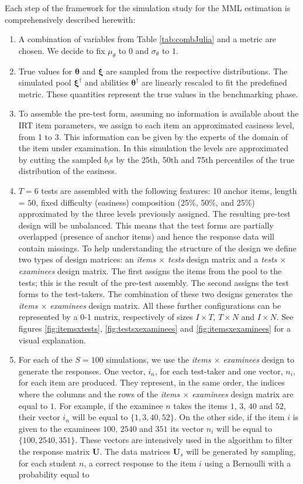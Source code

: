 Each step of the framework for the simulation study for the MML estimation is comprehensively described herewith:
\begin{enumerate}
	\item A combination of variables from Table \ref{tab:combJulia} and a metric are chosen. We decide to fix $\mu_\theta$ to $0$ and $\sigma_\theta$ to $1$.
	\item True values for $\boldsymbol\theta$ and $\boldsymbol{\xi}$ are sampled from the respective distributions. The simulated pool $\boldsymbol{\xi}^\dagger$ and abilities $\boldsymbol\theta^\dagger$ are linearly rescaled to fit the predefined metric. These quantities represent the true values in the benchmarking phase.
	\item To assemble the pre-test form, assuming no information is available about the IRT item parameters, we assign to each item an approximated easiness level, from 1 to 3. This information can be given by the experts of the domain of the item under examination. In this simulation the levels are approximated by cutting the sampled $b_i$s by the 25th, 50th and 75th percentiles of the true distribution of the easiness.
	\item $T=6$ tests are assembled with the following features: 10 anchor items, length = $50$, fixed difficulty (easiness) composition (25\%, 50\%, and 25\%) approximated by the three levels previously assigned. 
	The resulting pre-test design will be unbalanced. This means that the test forms are partially overlapped (presence of anchor items) and hence the response data will contain missings. To help understanding the structure of the design we define two types of design matrices: an \emph{items $\times$ tests} design matrix and a \emph{tests $\times$ examinees} design matrix. The first assigns the items from the pool to the tests; this is the result of the pre-test assembly. The second assigns the test forms to the test-takers. The combination of these two designs generates the \emph{items $\times$ examinees} design matrix. All these further configurations can be represented by a 0-1 matrix, respectively of sizes $I \times T$, $T\times N$ and $I \times N$. See figures \ref{fig:itemsxtests}, \ref{fig:testsxexaminees} and \ref{fig:itemsxexaminees} for a visual explanation. 	
	\item For each of the $S=100$ simulations, we use the \emph{items $\times$ examinees} design to generate the responses. One vector, $i_n$, for each test-taker and one vector, $n_i$, for each item are produced. They represent, in the same order, the indices where the columns and the rows of the \emph{items $\times$ examinees} design matrix are equal to $1$.
	For example, if the examinee $n$ takes the items $1$, $3$, $40$ and $52$, their vector $i_n$ will be equal to $\{1,3,40,52\}$. On the other side, if the item $i$ is given to the examinees $100$, $2540$ and $351$ its vector $n_i$ will be equal to $\{100,2540, 351\}$. These vectors are intensively used in the algorithm to filter the response matrix $\mathbf{U}$.
	The data matrices $\mathbf{U}_s$ will be generated by sampling, for each student $n$, a correct response to the item $i$ using a Bernoulli with a probability equal to
	

\end{enumerate}
